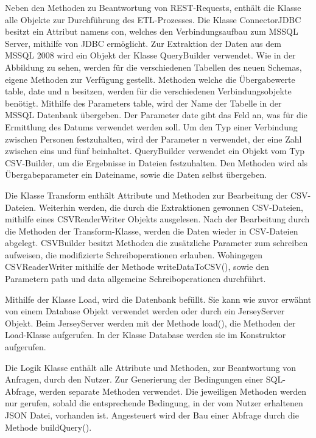 Neben den Methoden zu Beantwortung von REST-Requests, enthält die Klasse alle Objekte zur Durchführung des ETL-Prozesses. Die Klasse ConnectorJDBC besitzt ein Attribut namens con, welches den Verbindungsaufbau zum MSSQL Server, mithilfe von JDBC ermöglicht. Zur Extraktion der Daten aus dem MSSQL 2008 wird ein Objekt der Klasse QueryBuilder verwendet. Wie in der Abbildung zu sehen, werden für die verschiedenen Tabellen des neuen Schemas, eigene Methoden zur Verfügung gestellt. Methoden welche die Übergabewerte table, date und n besitzen, werden für die verschiedenen Verbindungsobjekte benötigt. Mithilfe des Parameters table, wird der Name der Tabelle in der MSSQL Datenbank übergeben. Der Parameter date gibt das Feld an, was für die Ermittlung des Datums verwendet werden soll. Um den Typ einer Verbindung zwischen Personen festzuhalten, wird der Parameter n verwendet, der eine Zahl zwischen eins und fünf beinhaltet. QueryBuilder verwendet ein Objekt vom Typ CSV-Builder, um die Ergebnisse in Dateien festzuhalten. Den Methoden wird als Übergabeparameter ein Dateiname, sowie die Daten selbst übergeben.

Die Klasse Transform enthält Attribute und Methoden zur Bearbeitung der CSV-Dateien. Weiterhin werden, die durch die Extraktionen gewonnen CSV-Dateien, mithilfe eines CSVReaderWriter Objekts ausgelesen. Nach der Bearbeitung durch die Methoden der Transform-Klasse, werden die Daten wieder in CSV-Dateien abgelegt. CSVBuilder besitzt Methoden die zusätzliche Parameter zum schreiben aufweisen, die modifizierte Schreiboperationen erlauben. Wohingegen CSVReaderWriter mithilfe der Methode writeDataToCSV(), sowie den Parametern path und data allgemeine Schreiboperationen durchführt.

Mithilfe der Klasse Load, wird die Datenbank befüllt. Sie kann wie zuvor erwähnt von einem Database Objekt verwendet werden oder durch ein JerseyServer Objekt. Beim JerseyServer werden mit der Methode load(), die Methoden der Load-Klasse aufgerufen. In der Klasse Database werden sie im Konstruktor aufgerufen. 

Die Logik Klasse enthält alle Attribute und Methoden, zur Beantwortung von Anfragen, durch den Nutzer. Zur Generierung der Bedingungen einer SQL-Abfrage, werden separate Methoden verwendet. Die jeweiligen Methoden werden nur gerufen, sobald die entsprechende Bedingung, in der vom Nutzer erhaltenen JSON Datei, vorhanden ist. Angesteuert wird der Bau einer Abfrage durch die Methode buildQuery(). 

